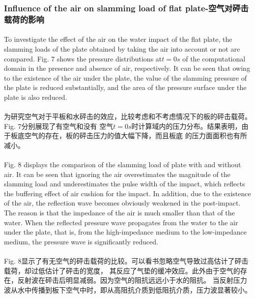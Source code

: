 \documentclass[UTF8]{ctexart}
\begin{document}
\subsubsection{Influence of the air on slamming load of flat plate-空气对砰击载荷的影响}
\paragraph{\quad}To investigate the effect of the air on the water impact of the flat plate, 
            the slamming loads of the plate obtained by taking the air into account or not are 
            compared. Fig. 7 shows the pressure distributions at$t = 0s$ of the computational 
            domain in the presence and absence of air, respectively. It can be seen that owing 
            to the existence of the air under the plate, the value of the slamming pressure of 
            the plate is reduced substantially, and the area of the pressure surface under the 
            plate is also reduced.
\paragraph{\quad}为研究空气对于平板和水砰击的效应，比较考虑和不考虑情况下的板的砰击载荷。Fig. 7分别展现了有空气和没有
                空气$t=0s$时计算域内的压力分布。结果表明，由于板底空气的存在，板的砰击压力的值大幅下降，而且板底
                的压力面面积也有所减小。

\paragraph{\quad}Fig. 8 displays the comparison of the slamming load of plate with and without air. 
                It can be seen that ignoring the air overestimates the magnitude of the slamming 
                load and underestimates the pulse width of the impact, which reflects the buffering 
                effect of air cushion for the impact. In addition, due to the existence of the air, 
                the reflection wave becomes obviously weakened in the post-impact. The reason is 
                that the impedance of the air is much smaller than that of the water. When the 
                reflected pressure wave propagates from the water to the air under the plate, 
                that is, from the high-impedance medium to the low-impedance medium, 
                the pressure wave is significantly reduced.
\paragraph{\quad}Fig. 8显示了有无空气的砰击载荷的比较。可以看书忽略空气导致过高估计了砰击载荷，却过低估计了砰击的宽度，
                其反应了气垫的缓冲效应。此外由于空气的存在，反射波在砰击后明显减弱。因为空气的阻抗远远小于水的阻抗。
                当反射压力波从水中传播到板下空气中时，即从高阻抗介质到低阻抗介质，压力波显著较小。
\end{document}
